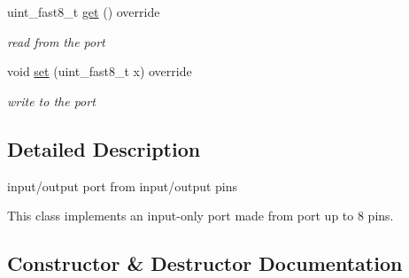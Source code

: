 \begin{DoxyCompactItemize}
uint\+\_\+fast8\+\_\+t \hyperlink{classhwlib_1_1port__in__out__from__pins_a5b8af7271d9fd08b005bc33ddada3cbe}{get} () override
\begin{DoxyCompactList}\small\item\em read from the port \end{DoxyCompactList}\item 
void \hyperlink{classhwlib_1_1port__in__out__from__pins_a6c2bbeca500638cb35f142e8f74bf857}{set} (uint\+\_\+fast8\+\_\+t x) override
\begin{DoxyCompactList}\small\item\em write to the port \end{DoxyCompactList}\end{DoxyCompactItemize}


\subsection{Detailed Description}
input/output port from input/output pins 

This class implements an input-\/only port made from port up to 8 pins. 

\subsection{Constructor \& Destructor Documentation}

